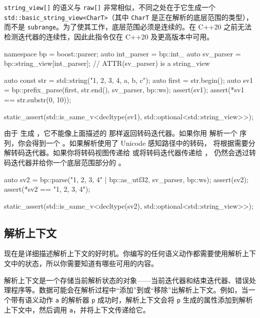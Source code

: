 \texttt{string\_view{[}{]}} 的语义与 \texttt{raw{[}{]}} 非常相似，不同之处在于它生成一个 \texttt{std::basic\_string\_view<CharT>}（其中 \texttt{CharT} 是正在解析的底层范围的类型），而不是 \texttt{subrange}。为了使其工作，底层范围必须是连续的。在 C++20 之前无法检测迭代器的连续性，因此此指令仅在 C++20 及更高版本中可用。

\begin{code}
namespace bp = boost::parser;
auto int_parser = bp::int_ %
auto sv_parser = bp::string_view[int_parser];  // ATTR(sv_parser) is a string_view

auto const str = std::string("1, 2, 3, 4, a, b, c");
auto first = str.begin();
auto sv1 = bp::prefix_parse(first, str.end(), sv_parser, bp::ws);
assert(sv1);
assert(*sv1 == str.substr(0, 10));

static_assert(std::is_same_v<decltype(sv1), std::optional<std::string_view>>);
\end{code}

由于  生成 ，它不能像上面描述的  那样返回转码迭代器。如果你用  解析一个  序列，你会得到一个 。如果解析使用了 Unicode 感知路径中的转码， 将根据需要分解转码迭代器。如果你将转码视图传递给  或将转码迭代器传递给 ， 仍然会透过转码迭代器并给你一个底层范围部分的 。

\begin{code}
auto sv2 = bp::parse("1, 2, 3, 4" | bp::as_utf32, sv_parser, bp::ws);
assert(sv2);
assert(*sv2 == "1, 2, 3, 4");

static_assert(std::is_same_v<decltype(sv2), std::optional<std::string_view>>);
\end{code}

\subsection{解析上下文}

现在是详细描述解析上下文的好时机。你编写的任何语义动作都需要使用解析上下文中的状态，所以你需要知道有哪些可用的内容。

解析上下文是一个存储当前解析状态的对象——当前迭代器和结束迭代器、错误处理程序等。数据可能会在解析过程中“添加”到或“移除”出解析上下文。例如，当一个带有语义动作 \texttt{a} 的解析器 \texttt{p} 成功时，解析上下文会将 \texttt{p} 生成的属性添加到解析上下文中，然后调用 \texttt{a}，并将上下文传递给它。

